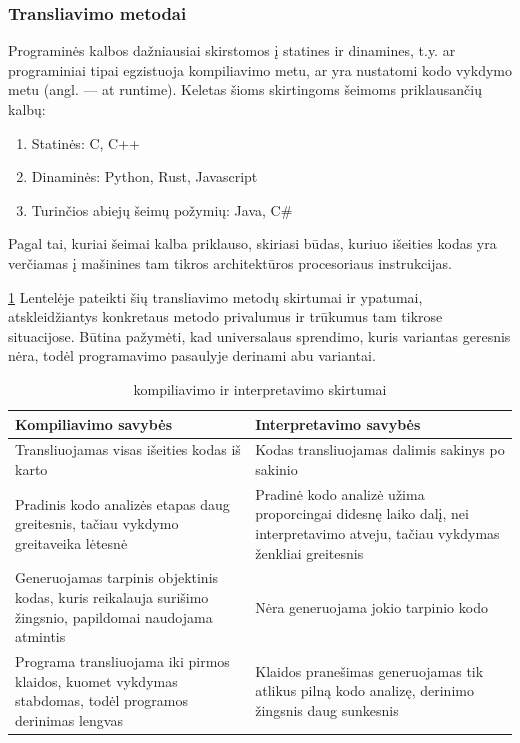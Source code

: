 \documentclass{VUMIFPSkursinis}
\begin{document}
\subsubsection{Transliavimo metodai}
Programinės kalbos dažniausiai skirstomos į statines ir dinamines, t.y. ar programiniai tipai egzistuoja kompiliavimo metu, ar yra nustatomi kodo vykdymo metu (angl. — at runtime). Keletas šioms skirtingoms šeimoms priklausančių kalbų:
\begin{enumerate}
    \item Statinės: C, C++
    \item Dinaminės: Python, Rust, Javascript
    \item Turinčios abiejų šeimų požymių: Java, C\#
\end{enumerate}

Pagal tai, kuriai šeimai kalba priklauso, skiriasi būdas, kuriuo išeities kodas yra verčiamas į mašinines tam tikros architektūros procesoriaus instrukcijas.

\ref{tab:kompiliavimas_interpretavimas} Lentelėje pateikti šių transliavimo metodų skirtumai ir ypatumai, atskleidžiantys konkretaus metodo privalumus ir trūkumus tam tikrose situacijose. Būtina pažymėti, kad universalaus sprendimo, kuris variantas geresnis nėra, todėl programavimo pasaulyje derinami abu variantai.

\begin{table}[H]
  \centering
  \caption{kompiliavimo ir interpretavimo skirtumai}
  {\begin{tabular}{|m{13em}|m{13em}|} \hline
     Kompiliavimo savybės & Interpretavimo savybės \\
    \hline
    Transliuojamas visas išeities kodas iš karto & Kodas transliuojamas dalimis 
 sakinys po sakinio \\
 \hline
     Pradinis kodo analizės etapas daug greitesnis, 
     tačiau vykdymo greitaveika lėtesnė  & Pradinė kodo analizė 
     užima proporcingai didesnę laiko dalį, nei interpretavimo atveju, 
     tačiau vykdymas ženkliai greitesnis  \\
    \hline
     Generuojamas tarpinis objektinis kodas, kuris
 reikalauja surišimo žingsnio, papildomai naudojama atmintis & Nėra generuojama jokio tarpinio kodo \\
 \hline
 Programa transliuojama iki pirmos klaidos, kuomet 
 vykdymas stabdomas, todėl programos derinimas lengvas & Klaidos pranešimas 
 generuojamas tik atlikus pilną kodo analizę, derinimo žingsnis daug sunkesnis \\
 \hline
  \end{tabular}}
  \label{tab:kompiliavimas_interpretavimas}
\end{table}
\end{document}
